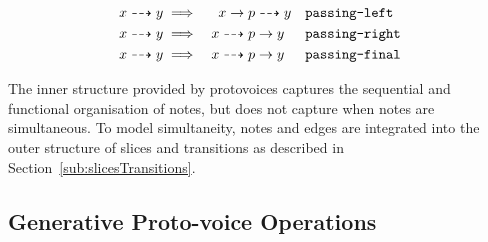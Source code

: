 \documentclass[12pt,a4paper,twoside,openany]{report} \usepackage[pdfborder={0 0 0}]{hyperref}    %
\theoremstyle{definition} \newtheorem{definition}{Definition}[section]
\begin{document}
\begin{equation} 
  \begin{aligned} 
    x \dashrightarrow y &\implies &x \to p &\dashrightarrow y && \text{\texttt{passing-left}} \label{eq:passing-left}\\ 
    x \dashrightarrow y &\implies &x \dashrightarrow p &\to y && \text{\texttt{passing-right}} \label{eq:passing-right}\\
    x \dashrightarrow y &\implies &x \dashrightarrow p &\to y && \text{\texttt{passing-final}} \label{eq:passing-final}\\ 
\end{aligned}  
\end{equation}

%

The inner structure provided by protovoices captures the sequential and functional organisation of notes, but does not
capture when notes are simultaneous. To model simultaneity, notes and edges are integrated into the outer structure of
slices and transitions as described in Section~\ref{sub:slicesTransitions}. 

\subsection{Generative Proto-voice Operations}
\label{sub:pvOps}
\end{document}
